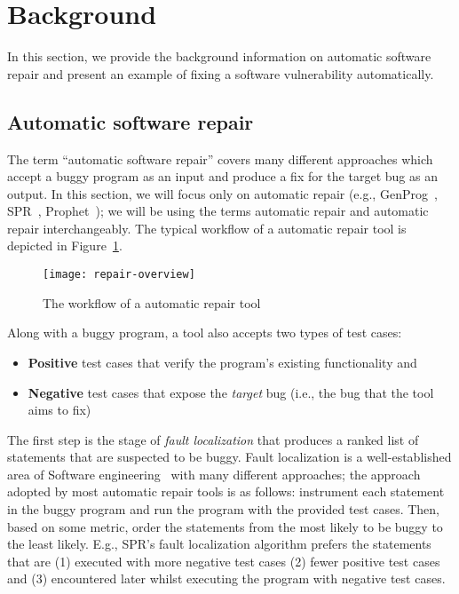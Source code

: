 \section{Background}
\label{section:background}

In this section, we provide the background information on automatic software repair and present an example of fixing a software vulnerability automatically.

\subsection{Automatic software repair}

The term ``automatic software repair'' covers many different approaches which accept a buggy program as an input and produce a fix for the target bug as an output.
In this section, we will focus only on \GV automatic repair (e.g., GenProg~\cite{le2012systematic}, SPR~\cite{long2015staged}, Prophet~\cite{long2015prophet}); we will be using the terms \GV automatic repair and automatic repair interchangeably.
The typical workflow of a \GV automatic repair tool is depicted in Figure~\ref{figure:repair-overview}.

\begin{figure}
    \texttt{[image: repair-overview]}
    \caption{The workflow of a \GV automatic repair tool}
    \label{figure:repair-overview}
\end{figure}

Along with a buggy program, a \GV tool also accepts two types of test cases:
\begin{itemize}
    \item \textbf{Positive} test cases that verify the program's existing functionality and
    \item \textbf{Negative} test cases that expose the \emph{target} bug (i.e., the bug that the tool aims to fix)
\end{itemize}

The first step is the stage of \emph{fault localization} that produces a ranked list of statements that are suspected to be buggy. Fault localization is a well-established area of Software engineering~\cite{wong2009survey} with many different approaches; the approach adopted by most automatic repair tools is as follows: instrument each statement in the buggy program and run the program with the provided test cases. Then, based on some metric, order the statements from the most likely to be buggy to the least likely. E.g., SPR's fault localization algorithm prefers the statements that are (1) executed with more negative test cases (2) fewer positive test cases and (3) encountered later whilst executing the program with negative test cases.

